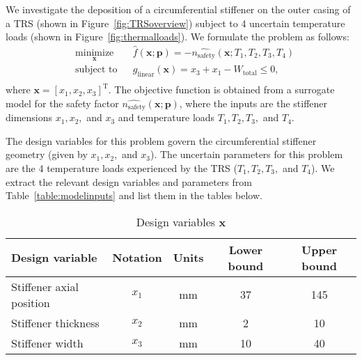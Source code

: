We investigate the deposition of a circumferential stiffener on the outer casing of a \ac{TRS} (shown in Figure~\ref{fig:TRSoverview}) subject to 4 uncertain temperature loads (shown in Figure~\ref{fig:thermalloads}). We formulate the problem as follows:
%
\begin{equation} \label{eq:Stoproblemdet}
    \begin{aligned}
        & \underset{\mathbf{x}}{\text{minimize}}
        & & \hat{f}(\mathbf{x};\mathbf{p}) = -\hat{n_{\textrm{safety}}}(\mathbf{x};T_1,T_2,T_3,T_4)\\
        & \text{subject to}
        & & {g_{\textrm{linear}}}(\mathbf{x}) = x_3 + x_1 - W_{\textrm{total}} \le 0,\\
    \end{aligned}
\end{equation}
%
where $\mathbf{x} = \left[x_1,x_2,x_3\right]^{\mathrm{T}}$. The objective function is obtained from a surrogate model for the safety factor $\hat{n_{\textrm{safety}}}(\mathbf{x};\mathbf{p})$, where the inputs are the stiffener dimensions $x_1,x_2,$ and $x_3$ and temperature loads $T_1,T_2,T_3,$ and $T_4$.

The design variables for this problem govern the circumferential stiffener geometry (given by $x_1,x_2,$ and $x_3$). The uncertain parameters for this problem are the 4 temperature loads experienced by the \ac{TRS} ($T_1,T_2,T_3,$ and $T_4$). We extract the relevant design variables and parameters from Table~\ref{table:modelinputs} and list them in the tables below.


\begin{table}[h!]
    \centering
    \renewcommand{\arraystretch}{1.0}%
    \small\addtolength{\tabcolsep}{-2pt}
    \caption{Design variables ${\textbf{x}}$}
    \label{table:STOmodelinputs}
    \begin{tabular}{lcccc}
    \hline\hline
    \bf Design variable & \bf Notation & \bf Units & \bf Lower bound & \bf Upper bound \\
    \hline
    Stiffener axial position & $x_1$ & mm & 37 & 145 \\
    Stiffener thickness  & $x_2$ & mm & 2 & 10 \\
    Stiffener width & $x_3$ & mm & 10 & 40  \\
    \hline\hline
    \end{tabular}
\end{table}

